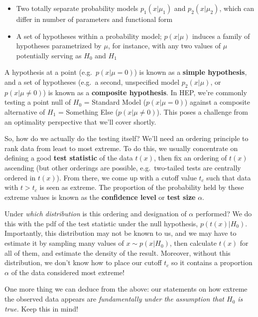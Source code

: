 \documentclass[
  11pt,
  numbers=noendperiod]{book}
\providecommand{\tightlist}{%
  \setlength{\itemsep}{0pt}\setlength{\parskip}{0pt}}\usepackage{longtable,booktabs,array}
\begin{document}
\begin{itemize}
\tightlist
\item
  Two totally separate probability models \(p_1(x | \mu_1)\) and
  \(p_2(x | \mu_2)\), which can differ in number of parameters and
  functional form
\item
  A set of hypotheses within a probability model; \(p(x | \mu)\) induces
  a family of hypotheses parametrized by \(\mu\), for instance, with any
  two values of \(\mu\) potentially serving as \(H_0\) and \(H_1\)
\end{itemize}

A hypothesis at a point (e.g.~\(p(x | \mu=0)\)) is known as a
\textbf{simple hypothesis}, and a set of hypotheses (e.g.~a second,
unspecified model \(p_2(x | \mu)\), or \(p(x | \mu\neq0)\)) is known as
a \textbf{composite hypothesis}. In HEP, we're commonly testing a point
null of \(H_0\) = Standard Model (\(p(x | \mu=0)\)) against a composite
alternative of \(H_1\) = Something Else (\(p(x | \mu\neq0)\)). This
poses a challenge from an optimality perspective that we'll cover
shortly.

So, how do we actually do the testing itself? We'll need an ordering
principle to rank data from least to most extreme. To do this, we
usually concentrate on defining a good \textbf{test statistic} of the
data \(t(x)\), then fix an ordering of \(t(x)\) ascending (but other
orderings are possible, e.g.~two-tailed tests are centrally ordered in
\(t(x)\)). From there, we come up with a cutoff value \(t_c\) such that
data with \(t > t_c\) is seen as extreme. The proportion of the
probability held by these extreme values is known as the
\textbf{confidence level} or \textbf{test size} \(\alpha\).

Under \emph{which distribution} is this ordering and designation of
\(\alpha\) performed? We do this with the pdf of the test statistic
under the null hypothesis, \(p(t(x)|H_0)\). Importantly, this
distribution may not be known to us, and we may have to estimate it by
sampling many values of \(x \sim p(x|H_0)\), then calculate \(t(x)\) for
all of them, and estimate the density of the result. Moreover, without
this distribution, we don't know how to place our cutoff \(t_c\) so it
contains a proportion \(\alpha\) of the data considered most extreme!

One more thing we can deduce from the above: our statements on how
extreme the observed data appears are \emph{fundamentally under the
assumption that \(H_0\) is true.} Keep this in mind!
\end{document}
